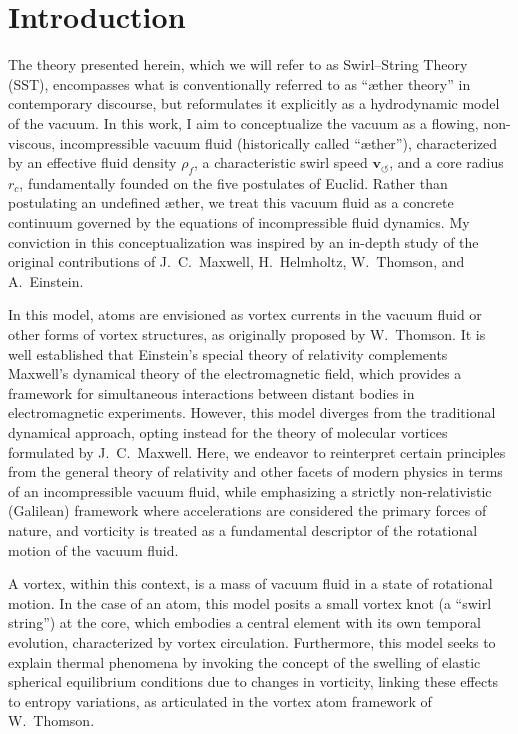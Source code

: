 \documentclass[10pt,reprint,aps,onecolumn,nofootinbib]{revtex4-2}
\begin{document}
    \section{Introduction}
    The theory presented herein, which we will refer to as Swirl--String Theory (SST), encompasses what is conventionally referred to as ``æther theory'' in contemporary discourse, but reformulates it explicitly as a hydrodynamic model of the vacuum. In this work, I aim to conceptualize the vacuum as a flowing, non-viscous, incompressible vacuum fluid (historically called ``æther''), characterized by an effective fluid density \(\rho_{\!f}\), a characteristic swirl speed \(\mathbf{v}_{\!\boldsymbol{\circlearrowleft}}\), and a core radius \(r_c\), fundamentally founded on the five postulates of Euclid. Rather than postulating an undefined æther, we treat this vacuum fluid as a concrete continuum governed by the equations of incompressible fluid dynamics. My conviction in this conceptualization was inspired by an in-depth study of the original contributions of J.~C.~Maxwell, H.~Helmholtz, W.~Thomson, and A.~Einstein.\cite{Maxwell1865,Helmholtz1858,Thomson1867,Einstein1905}

    In this model, atoms are envisioned as vortex currents in the vacuum fluid or other forms of vortex structures, as originally proposed by W.~Thomson.\cite{Thomson1867} It is well established that Einstein's special theory of relativity complements Maxwell's dynamical theory of the electromagnetic field,\cite{Maxwell1865} which provides a framework for simultaneous interactions between distant bodies in electromagnetic experiments. However, this model diverges from the traditional dynamical approach, opting instead for the theory of molecular vortices formulated by J.~C.~Maxwell. Here, we endeavor to reinterpret certain principles from the general theory of relativity and other facets of modern physics in terms of an incompressible vacuum fluid, while emphasizing a strictly non-relativistic (Galilean) framework where accelerations are considered the primary forces of nature, and vorticity is treated as a fundamental descriptor of the rotational motion of the vacuum fluid.

    A vortex, within this context, is a mass of vacuum fluid in a state of rotational motion. In the case of an atom, this model posits a small vortex knot (a ``swirl string'') at the core, which embodies a central element with its own temporal evolution, characterized by vortex circulation. Furthermore, this model seeks to explain thermal phenomena by invoking the concept of the swelling of elastic spherical equilibrium conditions due to changes in vorticity, linking these effects to entropy variations, as articulated in the vortex atom framework of W.~Thomson.\cite{Thomson1867}
\end{document}
